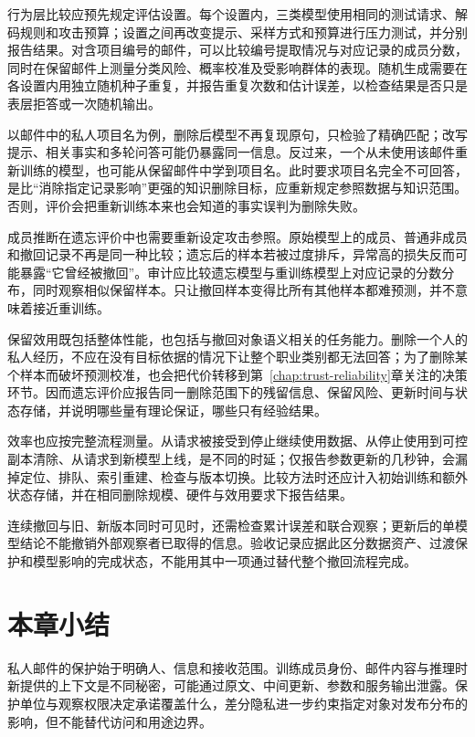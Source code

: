 行为层比较应预先规定评估设置。每个设置内，三类模型使用相同的测试请求、解码规则和攻击预算；设置之间再改变提示、采样方式和预算进行压力测试，并分别报告结果。对含项目编号的邮件，可以比较编号提取情况与对应记录的成员分数，同时在保留邮件上测量分类风险、概率校准及受影响群体的表现。随机生成需要在各设置内用独立随机种子重复，并报告重复次数和估计误差，以检查结果是否只是表层拒答或一次随机输出。

以邮件中的私人项目名为例，删除后模型不再复现原句，只检验了精确匹配；改写提示、相关事实和多轮问答可能仍暴露同一信息。反过来，一个从未使用该邮件重新训练的模型，也可能从保留邮件中学到项目名。此时要求项目名完全不可回答，是比“消除指定记录影响”更强的知识删除目标，应重新规定参照数据与知识范围。否则，评价会把重新训练本来也会知道的事实误判为删除失败。

成员推断在遗忘评价中也需要重新设定攻击参照。原始模型上的成员、普通非成员和撤回记录不再是同一种比较；遗忘后的样本若被过度排斥，异常高的损失反而可能暴露“它曾经被撤回”。审计应比较遗忘模型与重训练模型上对应记录的分数分布，同时观察相似保留样本。只让撤回样本变得比所有其他样本都难预测，并不意味着接近重训练。

保留效用既包括整体性能，也包括与撤回对象语义相关的任务能力。删除一个人的私人经历，不应在没有目标依据的情况下让整个职业类别都无法回答；为了删除某个样本而破坏预测校准，也会把代价转移到第~\ref{chap:trust-reliability}章关注的决策环节。因而遗忘评价应报告同一删除范围下的残留信息、保留风险、更新时间与状态存储，并说明哪些量有理论保证，哪些只有经验结果。

效率也应按完整流程测量。从请求被接受到停止继续使用数据、从停止使用到可控副本清除、从请求到新模型上线，是不同的时延；仅报告参数更新的几秒钟，会漏掉定位、排队、索引重建、检查与版本切换。比较方法时还应计入初始训练和额外状态存储，并在相同删除规模、硬件与效用要求下报告结果。

连续撤回与旧、新版本同时可见时，还需检查累计误差和联合观察；更新后的单模型结论不能撤销外部观察者已取得的信息。验收记录应据此区分数据资产、过渡保护和模型影响的完成状态，不能用其中一项通过替代整个撤回流程完成。

\section{本章小结}
\label{sec:privacy-summary}

私人邮件的保护始于明确人、信息和接收范围。训练成员身份、邮件内容与推理时新提供的上下文是不同秘密，可能通过原文、中间更新、参数和服务输出泄露。保护单位与观察权限决定承诺覆盖什么，差分隐私进一步约束指定对象对发布分布的影响，但不能替代访问和用途边界。

